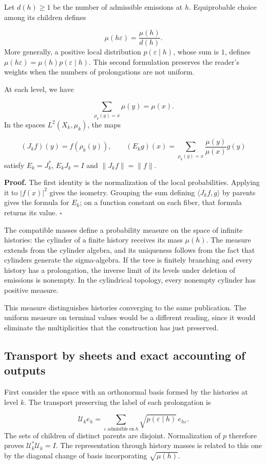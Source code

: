Let \(d(h)\geq1\) be the number of admissible emissions at \(h\). Equiprobable choice among its children defines

\[
\mu(h\varepsilon)=\frac{\mu(h)}{d(h)}.
\]
More generally, a positive local distribution \(p(\varepsilon\mid h)\), whose sum is \(1\), defines \(\mu(h\varepsilon)=\mu(h)p(\varepsilon\mid h)\). This second formulation preserves the reader's weights when the numbers of prolongations are not uniform.

At each level, we have

\[
\sum_{\rho_k(y)=x}\mu(y)=\mu(x).
\]
In the spaces \(L^2(X_k,\mu_k)\), the maps

\[
(J_kf)(y)=f(\rho_k(y)),
\qquad
(E_kg)(x)=\sum_{\rho_k(y)=x}\frac{\mu(y)}{\mu(x)}g(y)
\]
satisfy \(E_k=J_k^*\), \(E_kJ_k=I\) and \(\|J_kf\|=\|f\|\).

\textbf{Proof.} The first identity is the normalization of the local probabilities. Applying it to \(|f(x)|^2\) gives the isometry. Grouping the sum defining \(\langle J_kf,g\rangle\) by parents gives the formula for \(E_k\); on a function constant on each fiber, that formula returns its value. \hfill\(\square\)

The compatible masses define a probability measure on the space of infinite histories: the cylinder of a finite history receives its mass \(\mu(h)\). The measure extends from the cylinder algebra, and its uniqueness follows from the fact that cylinders generate the sigma-algebra. If the tree is finitely branching and every history has a prolongation, the inverse limit of its levels under deletion of emissions is nonempty. In the cylindrical topology, every nonempty cylinder has positive measure.

This measure distinguishes histories converging to the same publication. The uniform measure on terminal values would be a different reading, since it would eliminate the multiplicities that the construction has just preserved.

\subsection{Transport by sheets and exact accounting of outputs}
First consider the space with an orthonormal basis formed by the histories at level \(k\). The transport preserving the label of each prolongation is

\[
\mathcal U_ke_h=
\sum_{\varepsilon\ \mathrm{admisible\ en}\ h}
\sqrt{p(\varepsilon\mid h)}\,e_{h\varepsilon}.
\]
The sets of children of distinct parents are disjoint. Normalization of \(p\) therefore proves \(\mathcal U_k^*\mathcal U_k=I\). The representation through history masses is related to this one by the diagonal change of basis incorporating \(\sqrt{\mu(h)}\).

